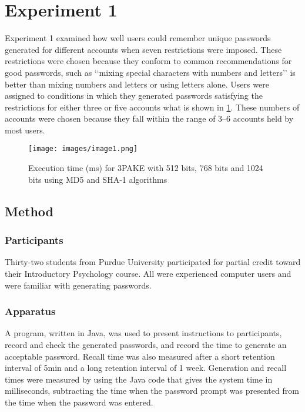 \documentclass[fleqn]{Paquetes/RevDigMatEduInt}
\begin{document}
\tableofcontents
\newpage 

\section{Experiment 1}

Experiment 1 examined how well users could remember unique passwords generated for different accounts when seven restrictions were imposed. These restrictions were chosen because they conform to common recommendations for good passwords, such as ‘‘mixing special characters with numbers and letters’’ is better than mixing numbers and letters or using letters alone. Users were assigned to conditions in which they generated passwords satisfying the restrictions for either three or five accounts what is shown in \ref{fig:1}. These numbers of accounts were chosen because they fall within the range of 3–6 accounts held by most users.

\begin{figure} [H]
    \centering
    \texttt{[image: images/image1.png]}
    \caption{Execution time (ms) for 3PAKE with 512 bits, 768 bits and 1024 bits using MD5 and SHA-1 algorithms}
    \label{fig:1}
\end{figure}


\subsection{Method}

\subsubsection{Participants}

Thirty-two students from Purdue University participated for partial credit toward their Introductory Psychology course. All were experienced computer users and were familiar with generating passwords.

\subsubsection{Apparatus}

A program, written in Java, was used to present instructions to participants, record and check the generated passwords, and record the time to generate an acceptable password. Recall time was also measured after a short retention interval of 5min and a long retention interval of 1 week. Generation and recall times were measured by using the Java code that gives the system time in milliseconds, subtracting the time when the password prompt was presented from the time when the password was entered.
\end{document}
